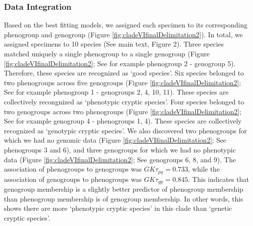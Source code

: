 \documentclass[
  11pt,
]{article}
\begin{document}
\hypertarget{data-integration-6}{%
\subsubsection{Data Integration}\label{data-integration-6}}

Based on the best fitting models, we assigned each specimen to its corresponding phenogroup and genogroup (Figure \ref{fig:cladeVIfinalDelimitation2}). In total, we assigned specimens to 10 species (See main text, Figure 2). Three species matched uniquely a single phenogroup to a single genogroup (Figure \ref{fig:cladeVIfinalDelimitation2}; See for example phenogroup 2 - genogroup 5). Therefore, these species are recognized as `good species'. Six species belonged to two phenogroups across five genogroups (Figure \ref{fig:cladeVIfinalDelimitation2}; See for example phenogroup 1 - genogroups 2, 4, 10, 11). These species are collectively recongnized as `phenotypic cryptic species'. Four species belonged to two genogroups across two phenogroups (Figure \ref{fig:cladeVIfinalDelimitation2}; See for example genogroup 4 - phenogroups 1, 4). These species are collectively recognized as `genotypic cryptic species'. We also discovered two phenogroups for which we had no genomic data (Figure \ref{fig:cladeVIfinalDelimitation2}; See phenogroups 3 and 6), and three genogroups for which we had no phenotypic data (Figure \ref{fig:cladeVIfinalDelimitation2}; See genogroups 6, 8, and 9). The association of phenogroups to genogroups was \(GK\tau_{pg}=0.733\), while the association of genogroups to phenogroups was \(GK\tau_{gp}=0.845\). This indicates that genogroup membership is a slightly better predictor of phenogroup membership than phenogroup membership is of genogroup membership. In other words, this shows there are more `phenotypic cryptic species' in this clade than `genetic cryptic species'.
\end{document}
